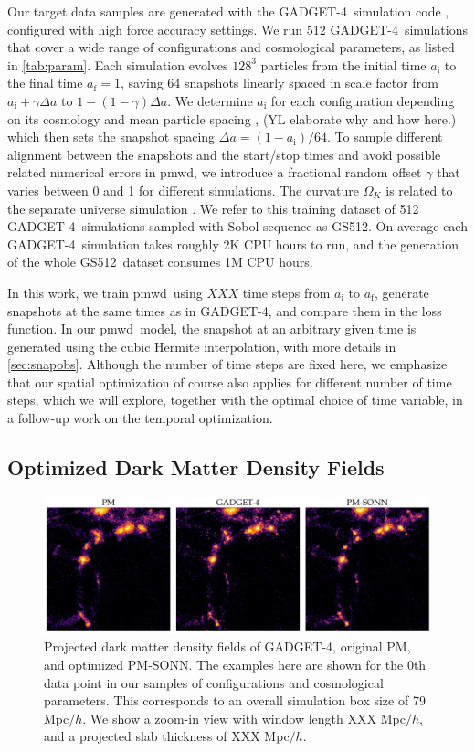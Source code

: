 \documentclass[modern, trackchanges, dvipsnames]{aastex631}
\newcommand{\pmwd}{{\usefont{T1}{nova}{m}{sl}pmwd}}
\newcommand{\GADGET}{{{\fontsize{10pt}{12pt}\selectfont GADGET}-4}}
\newcommand{\GSDATA}{{GS512}}
\newcommand{\OmegaK}{\Omega_K}
\newcommand{\ic}{\mathrm{i}}
\newcommand{\f}{\mathrm{f}}
\newcommand{\YL}[1]{\textcolor{Bittersweet}{#1}}
\begin{document}
Our target data samples are generated with the \GADGET\ simulation code
\citep{GADGET-4}, configured with high force accuracy settings.
We run 512 \GADGET\ simulations that cover a wide range of
configurations and cosmological parameters, as listed in
\autoref{tab:param}.
\YL{
Each simulation evolves $128^3$ particles from the initial time $a_\ic$
to the final time $a_\f=1$, saving 64 snapshots linearly spaced in scale
factor from $a_\ic + \gamma \Delta a$ to $1 - (1 - \gamma) \Delta a$.
We determine $a_\ic$ for each configuration depending on its cosmology
and mean particle spacing \citep{MichauxEtAl2021}, \YL{(YL elaborate why
and how here.)} which then sets the snapshot spacing $\Delta a = (1 -
a_\ic) / 64$.
To sample different alignment between the snapshots and the start/stop
times and avoid possible related numerical errors in \pmwd, we introduce
a fractional random offset $\gamma$ that varies between 0 and 1 for
different simulations.
}
The curvature $\OmegaK$ is related to the separate universe simulation
\citep{LiEtAl2014, WagnerEtAl2015}.
We refer to this training dataset of 512 \GADGET\ simulations
sampled with Sobol sequence as \GSDATA.
On average each \GADGET\ simulation takes roughly 2K CPU hours to run,
and the generation of the whole \GSDATA\ dataset consumes 1M CPU hours.

\YL{
In this work, we train \pmwd\ using $XXX$ time steps from $a_\ic$ to
$a_\f$, generate snapshots at the same times as in \GADGET, and compare
them in the loss function.}
In our \pmwd\ model, the snapshot at an arbitrary given time is
generated using the cubic Hermite interpolation, with more details in
\autoref{sec:snapobs}.
\YL{Although the number of time steps are fixed here, we emphasize that
our spatial optimization of course also applies for different number of
time steps, which we will explore, together with the optimal choice of
time variable, in a follow-up work on the temporal optimization.
}


\subsection{Optimized Dark Matter Density Fields}

\begin{figure}
  \centering
  \includegraphics[width=.98\columnwidth]{slab_s0_snap120_3177874_e3000.pdf}
  \caption{Projected dark matter density fields of \GADGET, original PM,
  and optimized PM-SONN.
  The examples here are shown for the 0th data point in our samples of
  configurations and cosmological parameters.
  This corresponds to an overall simulation box size of 79 Mpc$/h$.
  We show a zoom-in view with window length XXX Mpc$/h$, and a projected
  slab thickness of XXX Mpc$/h$.}
  \label{fig:denslab}
\end{figure}
\end{document}

